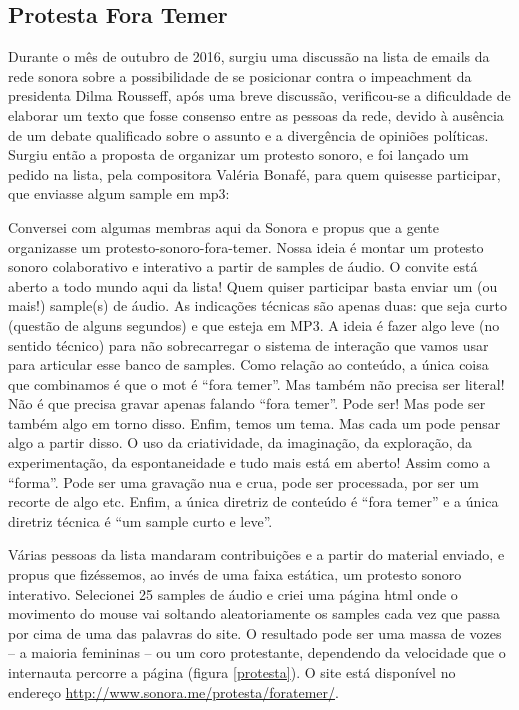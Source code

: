 \subsection{Protesta Fora Temer}
Durante o mês de outubro de 2016, surgiu uma discussão na lista de emails da rede sonora sobre a possibilidade de se posicionar contra o impeachment da presidenta Dilma Rousseff, após uma breve discussão, verificou-se a dificuldade de elaborar um texto que fosse consenso entre as pessoas da rede, devido à ausência de um debate qualificado sobre o assunto e a divergência de opiniões políticas. 
Surgiu então a proposta de organizar um protesto sonoro, e foi lançado um pedido na lista, pela compositora Valéria Bonafé, para quem quisesse participar, que enviasse algum sample em mp3: 
\begin{citacao}
Conversei com algumas membras aqui da Sonora e propus que a gente organizasse um protesto-sonoro-fora-temer. Nossa ideia é montar um protesto sonoro colaborativo e interativo a partir de samples de áudio. O convite está aberto a todo mundo aqui da lista! Quem quiser participar basta enviar um (ou mais!) sample(s) de áudio. As indicações técnicas são apenas duas: que seja curto (questão de alguns segundos) e que esteja em MP3. A ideia é fazer algo leve (no sentido técnico) para não sobrecarregar o sistema de interação que vamos usar para articular esse banco de samples. Como relação ao conteúdo, a única coisa que combinamos é que o mot é “fora temer”. Mas também não precisa ser literal! Não é que precisa gravar apenas falando “fora temer”. Pode ser! Mas pode ser também algo em torno disso. Enfim, temos um tema. Mas cada um pode pensar algo a partir disso. O uso da criatividade, da imaginação, da exploração, da experimentação, da espontaneidade e tudo mais está em aberto! Assim como a “forma”. Pode ser uma gravação nua e crua, pode ser processada, por ser um recorte de algo etc. Enfim, a única diretriz de conteúdo é “fora temer” e a única diretriz técnica é “um sample curto e leve”.
\end{citacao}
Várias pessoas da lista mandaram contribuições e a partir do material enviado, e propus que fizéssemos, ao invés de uma faixa estática, um protesto sonoro interativo. Selecionei 25 samples de áudio e criei uma página html onde o movimento do mouse vai soltando aleatoriamente os samples cada vez que passa por cima de uma das palavras do site. O resultado pode ser uma massa de vozes – a maioria femininas – ou um coro protestante, dependendo da velocidade que o internauta percorre a página (figura \ref{protesta}). O site está disponível no endereço \url{http://www.sonora.me/protesta/foratemer/}. 

